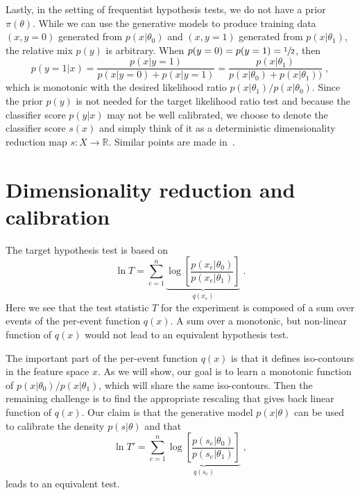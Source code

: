 \documentclass[11pt, oneside]{article}   	%
\begin{document}
Lastly, in the setting of frequentist hypothesis tests, we do not have a prior $\pi(\theta)$. 
While we can use the generative models to produce training data $(x,y=0)$ generated 
from $p(x|\theta_0)$ and $(x,y=1)$ generated from $p(x|\theta_1)$, the relative mix $p(y)$ 
is arbitrary.  When $p(y=0)=p(y=1)=\sfrac{1}{2}$, then 
\begin{equation}
p(y=1 | x) = \frac{p(x|y=1)}{p(x|y=0)+p(x|y=1)} = \frac{p(x|\theta_1)}{p(x|\theta_0)+p(x|\theta_1))} \;,
\end{equation}
which is monotonic with the desired likelihood ratio $p(x|\theta_1)/p(x|\theta_0)$.
Since the prior $p(y)$ is not needed for the target likelihood ratio test and because the classifier score $p(y|x)$ may not be well calibrated, we choose to denote the classifier score $s(x)$ and simply think of it as a deterministic dimensionality reduction map $s: X \to \mathbb{R}$.  Similar points are made in~\citep{ClaytonScott}.




\section{Dimensionality reduction and calibration}


 The target hypothesis test is based on 
\begin{equation}
\ln T =   \sum_{e=1}^n \underbrace{\log \left[ \frac {p(x_e | \theta_0) }{ p(x_e | \theta_1) } \right]}_{q(x_e)} \;.
\end{equation}
Here we see that the test statistic $T$ for the experiment is composed of a sum over events of the per-event function $q(x)$. A sum over a monotonic, but non-linear function of $q(x)$ would not lead to an equivalent hypothesis test. 

The important part of the per-event function $q(x)$ is that it defines iso-contours in the feature space $x$. As we will show, our goal is to learn a monotonic function of $p(x|\theta_0)/p(x|\theta_1)$, which will share the same iso-contours. Then the remaining challenge is to find the appropriate rescaling that gives back  linear function of $q(x)$. Our claim is that the generative model $p(x|\theta)$ can be used to calibrate the density $p(s|\theta)$ and that
\begin{equation}
\ln T' = \sum_{e=1}^n \underbrace{\log \left[ \frac {p(s_e | \theta_0) }{ p(s_e | \theta_1) } \right]}_{q(s_e)} \;,
\end{equation}
leads to an equivalent test.
\end{document}

